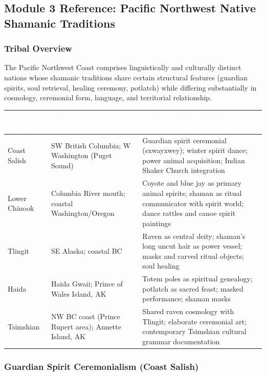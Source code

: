 \documentclass[11pt,letterpaper]{article}
\newcommand{\tableheader}[1]{\textbf{\sffamily\textcolor{white}{#1}}}
\begin{document}
\subsection{Module 3 Reference: Pacific Northwest Native Shamanic Traditions}

\subsubsection{Tribal Overview}

The Pacific Northwest Coast comprises linguistically and culturally distinct nations whose shamanic traditions share certain structural features (guardian spirits, soul retrieval, healing ceremony, potlatch) while differing substantially in cosmology, ceremonial form, language, and territorial relationship.

\begin{center}
\begin{tabularx}{\textwidth}{L{2.8cm}L{3cm}X}
\toprule
{}
\tableheader{Nation / Group} & \tableheader{Territory} & \tableheader{Key Shamanic Features} \\
\midrule
Coast Salish & SW British Columbia; W Washington (Puget Sound) & Guardian spirit ceremonial (sxwayxwey); winter spirit dance; power animal acquisition; Indian Shaker Church integration \\
Lower Chinook & Columbia River mouth; coastal Washington/Oregon & Coyote and blue jay as primary animal spirits; shaman as ritual communicator with spirit world; dance rattles and canoe spirit paintings \\
Tlingit & SE Alaska; coastal BC & Raven as central deity; shaman's long uncut hair as power vessel; masks and carved ritual objects; soul healing \\
Haida & Haida Gwaii; Prince of Wales Island, AK & Totem poles as spiritual genealogy; potlatch as sacred feast; masked performance; shaman masks \\
Tsimshian & NW BC coast (Prince Rupert area); Annette Island, AK & Shared raven cosmology with Tlingit; elaborate ceremonial art; contemporary Tsimshian cultural grammar documentation \\
\bottomrule
\end{tabularx}
\end{center}

\subsubsection{Guardian Spirit Ceremonialism (Coast Salish)}
\end{document}
